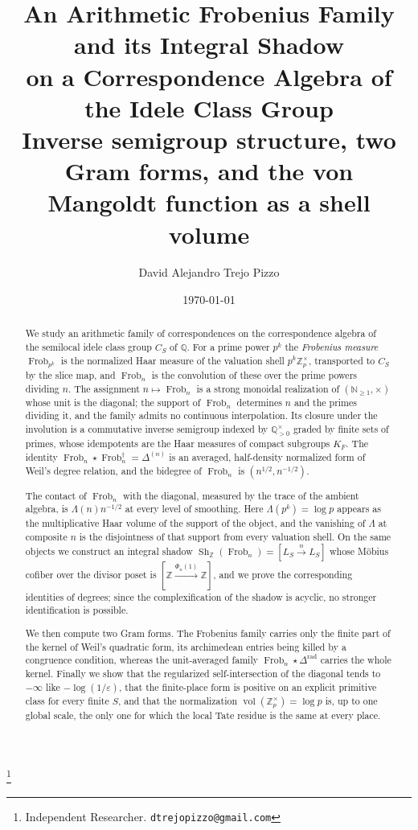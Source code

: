 \documentclass[11pt]{amsart}
\theoremstyle{definition}
\theoremstyle{remark}
\newcommand{\N}{\mathbb N}
\newcommand{\Z}{\mathbb Z}
\newcommand{\Q}{\mathbb Q}
\newcommand{\Frob}{\operatorname{Frob}}
\newcommand{\Sh}{\operatorname{Sh}}
\newcommand{\vol}{\operatorname{vol}}
\begin{document}
\title[An arithmetic Frobenius family and its integral shadow]
{An Arithmetic Frobenius Family and its Integral Shadow\\
on a Correspondence Algebra of the Idele Class Group\\[4pt]
\large Inverse semigroup structure, two Gram forms,
and the von Mangoldt function as a shell volume}

\author{David Alejandro Trejo Pizzo}
\thanks{Independent Researcher. \texttt{dtrejopizzo@gmail.com}}

\date{\today}

\begin{abstract}
We study an arithmetic family of correspondences on the correspondence
algebra of the semilocal idele class group $C_S$ of $\Q$.  For a prime power
$p^k$ the \emph{Frobenius measure} $\Frob_{p^k}$ is the normalized Haar
measure of the valuation shell $p^k\Z_p^\times$, transported to $C_S$ by the
slice map, and $\Frob_n$ is the convolution of these over the prime powers
dividing $n$.  The assignment $n\mapsto\Frob_n$ is a strong monoidal
realization of $(\N_{\ge1},\times)$ whose unit is the diagonal; the support of
$\Frob_n$ determines $n$ and the primes dividing it, and the family admits no
continuous interpolation.  Its closure under the involution is a commutative
inverse semigroup indexed by $\Q_{>0}^\times$ graded by finite sets of primes,
whose idempotents are the Haar measures of compact subgroups $K_F$.  The
identity $\Frob_n\star\Frob_n^\dagger=\Delta^{(n)}$ is an averaged,
half-density normalized form of Weil's degree relation, and the bidegree of
$\Frob_n$ is $(n^{1/2},n^{-1/2})$.

The contact of $\Frob_n$ with the diagonal, measured by the trace of the
ambient algebra, is $\Lambda(n)n^{-1/2}$ at every level of smoothing.  Here
$\Lambda(p^k)=\log p$ appears as the multiplicative Haar volume of the support
of the object, and the vanishing of $\Lambda$ at composite $n$ is the
disjointness of that support from every valuation shell.  On the same objects
we construct an integral shadow $\Sh_\Z(\Frob_n)=[L_S\xrightarrow{n}L_S]$
whose M\"obius cofiber over the divisor poset is
$[\Z\xrightarrow{\Phi_n(1)}\Z]$, and we prove the corresponding identities of
degrees; since the complexification of the shadow is acyclic, no stronger
identification is possible.

We then compute two Gram forms.  The Frobenius family carries only the finite
part of the kernel of Weil's quadratic form, its archimedean entries being
killed by a congruence condition, whereas the unit-averaged family
$\Frob_n\star\Delta^{\mathrm{rad}}$ carries the whole kernel.  Finally we show
that the regularized self-intersection of the diagonal tends to $-\infty$ like
$-\log(1/\varepsilon)$, that the finite-place form is positive on an explicit
primitive class for every finite $S$, and that the normalization
$\vol(\Z_p^\times)=\log p$ is, up to one global scale, the only one for which
the local Tate residue is the same at every place.
\end{abstract}
\end{document}

